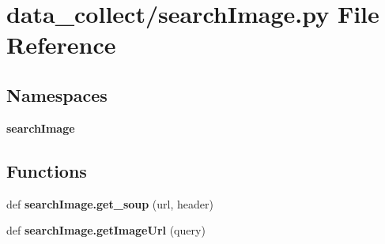 \section{data\+\_\+collect/search\+Image.py File Reference}
\label{search_image_8py}
\subsection*{Namespaces}
\begin{DoxyCompactItemize}
\item 
 {\bf search\+Image}
\end{DoxyCompactItemize}
\subsection*{Functions}
\begin{DoxyCompactItemize}
\item 
def {\bf search\+Image.\+get\+\_\+soup} (url, header)
\item 
def {\bf search\+Image.\+get\+Image\+Url} (query)
\end{DoxyCompactItemize}

